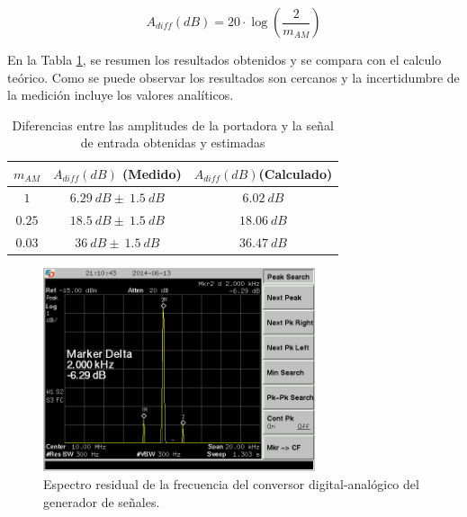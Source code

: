 \documentclass[a4paper,10pt]{article}
\begin{document}
		$$A_{diff}(dB)=20\cdot\log(\frac{2}{m_{AM}})$$
		
		\indent En la Tabla \ref{AM}, se resumen los resultados obtenidos y se 
		compara con el calculo te\'orico. Como se puede observar los resultados 
		son cercanos y la incertidumbre de la medici\'on incluye los valores 
		anal\'iticos.
		
		\begin{table}[!htp]
			\centering
			\begin{tabular}{|c|c|c|}
				\hline
				$m_{AM}$ & $A_{diff}(dB)$ (Medido) & $A_{diff}(dB)$(Calculado)\\
				\hline
				$1$ & $6.29~dB\pm~1.5~dB$& $6.02~dB$ \\
				\hline
				$0.25$ & $18.5~dB\pm~1.5~dB$& $18.06~dB$ \\
				\hline
				$0.03$ & $36~dB\pm~1.5~dB$& $36.47~dB$
			\end{tabular}
			\caption{Diferencias entre las amplitudes de la portadora y la 
			se\~nal de entrada obtenidas y estimadas} \label{AM}
		\end{table}	
		
		\begin{figure}[!htb]
				\centering
				\includegraphics[width=8cm]
				{Imagenes/SCREN456.png}
				\caption{Espectro residual de la frecuencia del conversor 
				digital-anal\'ogico del generador de se\~nales.}
				\label{AM1} 
		\end{figure}
\end{document}
